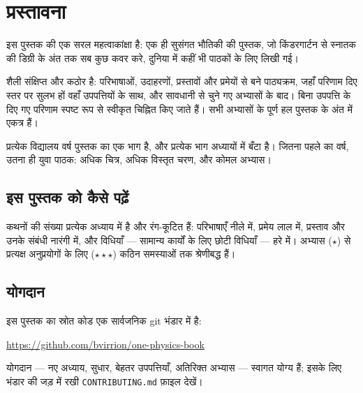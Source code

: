 \chapter{प्रस्तावना}

इस पुस्तक की एक सरल महत्वाकांक्षा है: एक ही सुसंगत भौतिकी की पुस्तक, जो
किंडरगार्टन से स्नातक की डिग्री के अंत तक सब कुछ कवर करे, दुनिया में कहीं
भी पाठकों के लिए लिखी गई।

शैली संक्षिप्त और कठोर है: परिभाषाओं, उदाहरणों, प्रस्तावों और प्रमेयों से
बने पाठ्यक्रम, जहाँ परिणाम दिए स्तर पर सुलभ हों वहाँ उपपत्तियों के साथ,
और सावधानी से चुने गए अभ्यासों के बाद। बिना उपपत्ति के दिए गए परिणाम
स्पष्ट रूप से स्वीकृत चिह्नित किए जाते हैं। सभी अभ्यासों के पूर्ण हल
पुस्तक के अंत में एकत्र हैं।

प्रत्येक विद्यालय वर्ष पुस्तक का एक भाग है, और प्रत्येक भाग अध्यायों में
बँटा है। जितना पहले का वर्ष, उतना ही युवा पाठक: अधिक चित्र, अधिक विस्तृत
चरण, और कोमल अभ्यास।

\section*{इस पुस्तक को कैसे पढ़ें}

कथनों की संख्या प्रत्येक अध्याय में है और रंग-कूटित हैं: परिभाषाएँ नीले
में, प्रमेय लाल में, प्रस्ताव और उनके संबंधी नारंगी में, और विधियाँ ---
सामान्य कार्यों के लिए छोटी विधियाँ --- हरे में। अभ्यास ($\star$) से
प्रत्यक्ष अनुप्रयोगों के लिए ($\star\star\star$) कठिन समस्याओं तक
श्रेणीबद्ध हैं।

\section*{योगदान}

इस पुस्तक का स्रोत कोड एक सार्वजनिक git भंडार में है:
\begin{center}
\url{https://github.com/bvirrion/one-physics-book}
\end{center}
योगदान --- नए अध्याय, सुधार, बेहतर उपपत्तियाँ, अतिरिक्त अभ्यास ---
स्वागत योग्य हैं; इसके लिए भंडार की जड़ में रखी
\texttt{CONTRIBUTING.md} फ़ाइल देखें।
